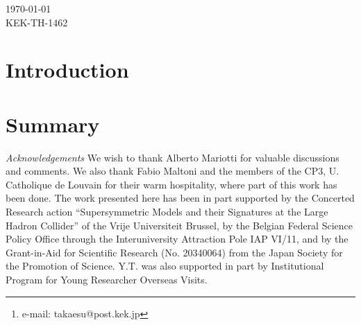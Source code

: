 \documentclass[epj,nopacs,fleqn]{svjour}
\begin{document}
\title{}

\author{
Y.~Takaesu\fnmsep\thanks{e-mail: takaesu@post.kek.jp} 
}


\abstract{
}

\titlerunning{
}


\maketitle

\vspace*{-11cm}
\noindent\today\\
KEK-TH-1462
\vspace*{8.9cm}


\section{Introduction}\label{intro}

\section{}
\label{sec:n1nlsp}

\section{Summary}\label{sec:summary}

\begin{acknowledgement}{\textit{Acknowledgements}}
We wish to thank Alberto Mariotti for valuable discussions and comments.
We also thank Fabio Maltoni and the members of the CP3, 
U. Catholique de Louvain for their warm hospitality, where part
 of this work has been done.
The work presented here has been in part supported by the Concerted
 Research action 
``Supersymmetric Models and their Signatures at the Large Hadron
 Collider'' 
of the Vrije Universiteit Brussel,
by the Belgian Federal Science Policy Office through the Interuniversity
 Attraction Pole IAP VI/11, 
and by the Grant-in-Aid for Scientific Research (No. 20340064) from the
 Japan Society for the Promotion of Science.  
Y.T. was also supported in part by Institutional Program for Young
 Researcher Overseas Visits.
\end{acknowledgement}
\end{document}
